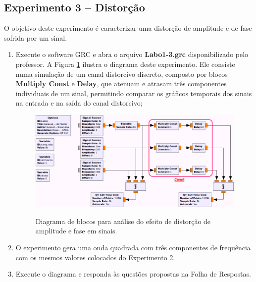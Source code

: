 \documentclass[12pt,addpoints]{exam}
\newcommand{\myscale}{0.4}
\begin{document}
\newpage

\subsection{Experimento 3 -- Distorção}


    
O objetivo deste experimento é caracterizar uma distorção de amplitude e de fase sofrida por um sinal.

\begin{enumerate}
    \item Execute o software GRC e abra o arquivo \textbf{Labo1-3.grc} disponibilizado pelo professor. A Figura \ref{fig:GRC_1-3} ilustra o diagrama deste experimento. Ele consiste numa simulação de um canal distorcivo discreto, composto por blocos \textbf{Multiply Const} e \textbf{Delay}, que atenuam e atrasam três componentes individuais de um sinal, permitindo comparar os gráficos temporais dos sinais na entrada e na saída do canal distorcivo;
    
\begin{figure}[h]
        \centering
        \includegraphics[scale=\myscale]{./Figuras/GRC_1-3} \\
        \caption{Diagrama de blocos para análise do efeito de distorção de amplitude e fase em sinais.} 
        \label{fig:GRC_1-3}       
\end{figure}

  \item O experimento gera uma onda quadrada com três componentes de frequência com os mesmos valores colocados do Experimento 2.
    
    \item Execute o diagrama e responda às questões propostas na Folha de Respostas.
\end{enumerate}
\end{document}
